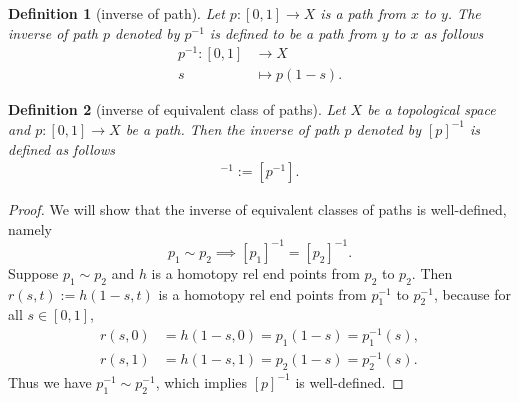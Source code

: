\documentclass{report}
\newtheorem{definition}{Definition}[section]
\theoremstyle{nonumberplain}
\newtheorem{proof}{Proof.}
\begin{document}
\begin{definition}[inverse of path]
	Let $p: [0,1] \longrightarrow X$ is a path from $x$ to $y$. The \emph{inverse of path $p$} denoted by $p^{-1}$ is defined to be a path from $y$ to $x$ as follows
	\begin{align*}
		p^{-1}:[0,1]&\longrightarrow X\\
		s &\longmapsto p(1-s).
	\end{align*}
\end{definition}
\begin{definition}[inverse of equivalent class of paths]
	Let $X$ be a topological space and $p:[0,1]\to X$ be a path. Then the \emph{inverse of path $p$} denoted by $[p]^{-1}$ is defined as follows
	\begin{align*}
		[p]^{-1}:=[p^{-1}].
	\end{align*}
\end{definition}
\begin{proof}
	We will show that the inverse of equivalent classes of paths is well-defined, namely 
	\[
		p_1\sim p_2\implies [p_1]^{-1} = [p_2]^{-1}.
	\]
	Suppose $p_1\sim p_2$ and $h$ is a homotopy rel end points from $p_2$ to $p_2$. Then $r(s,t):=h(1-s, t)$
	is a homotopy rel end points from $p_1^{-1}$ to $p_2^{-1}$, because for all $s\in[0,1]$,
	\begin{align*}
		r(s,0)&=h(1-s,0)=p_1(1-s)=p_1^{-1}(s),\\
		r(s,1)&=h(1-s,1)=p_2(1-s)=p_2^{-1}(s).
	\end{align*}
	Thus we have $p_1^{-1}\sim p_2^{-1}$, which implies $[p]^{-1}$ is well-defined.
\end{proof}
\end{document}
